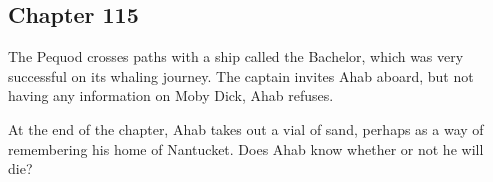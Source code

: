 \subsection{Chapter 115}

The Pequod crosses paths with a ship called the Bachelor, which was very
successful on its whaling journey. The captain invites Ahab aboard, but not
having any information on Moby Dick, Ahab refuses.

At the end of the chapter, Ahab takes out a vial of sand, perhaps as a way of
remembering his home of Nantucket. Does Ahab know whether or not he will die?

